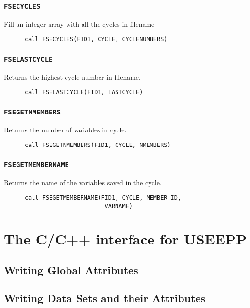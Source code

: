 \subsubsection{\texttt{FSECYCLES}}
Fill an integer array with all the cycles in filename
\begin{verbatim}
      call FSECYCLES(FID1, CYCLE, CYCLENUMBERS)
\end{verbatim}

\subsubsection{\texttt{FSELASTCYCLE}}
Returns the highest cycle number in filename.
\begin{verbatim}
      call FSELASTCYCLE(FID1, LASTCYCLE)
\end{verbatim}

\subsubsection{\texttt{FSEGETNMEMBERS}}
Returns the number of variables in cycle.
\begin{verbatim}
      call FSEGETNMEMBERS(FID1, CYCLE, NMEMBERS)
\end{verbatim}

\subsubsection{\texttt{FSEGETMEMBERNAME}}
Returns the name of the variables saved in the cycle.
\begin{verbatim}
      call FSEGETMEMBERNAME(FID1, CYCLE, MEMBER_ID, 
                             VARNAME)
\end{verbatim}




\section{The C/C++ interface for USEEPP}

\subsection{Writing Global Attributes}

\subsection{Writing Data Sets and their Attributes}

